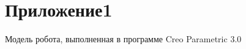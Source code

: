 \section{Приложение1}
Модель робота, выполненная в программе Creo Parametric 3.0

\vspace{0.5em}

\begin{figure}[H]
	\begin{minipage}[h]{0.47\linewidth}
	\end{minipage}
	\hfill
	\begin{minipage}[h]{0.47\linewidth}

\end{minipage}
\end{figure}
